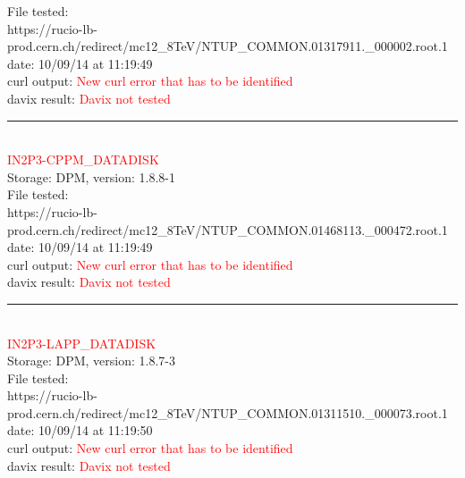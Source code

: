 File tested:\\
\footnotesize{https://rucio-lb-prod.cern.ch/redirect/mc12\_8TeV/NTUP\_COMMON.01317911.\_000002.root.1}\\

date: 10/09/14 at 11:19:49\\

curl output:  \textcolor{red}{New curl error that has to be identified}\\

davix result:  \textcolor{red}{Davix not tested}\\

\rule{\textwidth}{1pt}\\

\textcolor{red}{\normalsize{IN2P3-CPPM\_DATADISK}}\\

Storage: DPM, version: 1.8.8-1\\

File tested:\\
\footnotesize{https://rucio-lb-prod.cern.ch/redirect/mc12\_8TeV/NTUP\_COMMON.01468113.\_000472.root.1}\\

date: 10/09/14 at 11:19:49\\

curl output:  \textcolor{red}{New curl error that has to be identified}\\

davix result:  \textcolor{red}{Davix not tested}\\

\rule{\textwidth}{1pt}\\

\textcolor{red}{\normalsize{IN2P3-LAPP\_DATADISK}}\\

Storage: DPM, version: 1.8.7-3\\

File tested:\\
\footnotesize{https://rucio-lb-prod.cern.ch/redirect/mc12\_8TeV/NTUP\_COMMON.01311510.\_000073.root.1}\\

date: 10/09/14 at 11:19:50\\

curl output:  \textcolor{red}{New curl error that has to be identified}\\

davix result:  \textcolor{red}{Davix not tested}\\

